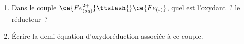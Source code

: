 \begin{enumerate}
    \item Dans le couple $\ce{Fe^{2+}_{(aq)}}\ttslash{}\ce{Fe_{(s)}}$, quel est
          l'oxydant~? le réducteur~?
    \item Écrire la demi-équation d'oxydoréduction associée à ce couple.
\end{enumerate}

